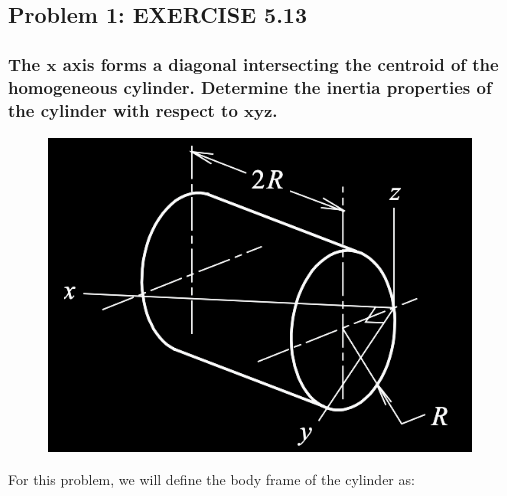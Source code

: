 \documentclass[12pt, letterpaper]{../assignment}
\begin{document}
\subsection*{Problem 1: EXERCISE 5.13}
\subsubsection*{The $\bm{x}$ axis forms a diagonal intersecting the centroid of the homogeneous cylinder.
Determine the inertia properties of the cylinder with respect to $\bm{xyz}$.}

\begin{figure}[H]
    \centering
    \includegraphics[scale=0.7,frame]{images/Q5_13.png}
\end{figure}

For this problem,
we will define the body frame of the cylinder as:
\end{document}
